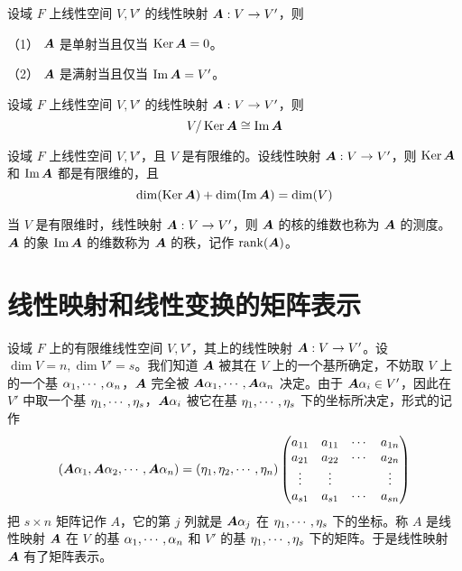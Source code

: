 \begin{proposition}
	设域 $F$ 上线性空间 $V,V'$ 的线性映射 $\boldsymbol{A} : V \to V'$，则
	
	（1） $\boldsymbol{A}$ 是单射当且仅当 $\operatorname{Ker} \boldsymbol{A} = 0$。
	
	（2） $\boldsymbol{A}$ 是满射当且仅当 $\operatorname{Im} \boldsymbol{A} = V'$。
\end{proposition}

\begin{theorem}
	设域 $F$ 上线性空间 $V,V'$ 的线性映射 $\boldsymbol{A} : V \to V'$，则
	\[ V / \operatorname{Ker} \boldsymbol{A} \cong \operatorname{Im} \boldsymbol{A} \]
\end{theorem}

\begin{theorem}
	设域 $F$ 上线性空间 $V,V'$，且 $V$ 是有限维的。设线性映射 $\boldsymbol{A} : V \to V'$，则 $\operatorname{Ker} \boldsymbol{A}$ 和 $\operatorname{Im} \boldsymbol{A}$ 都是有限维的，且
	\[ \dim(\operatorname{Ker} \boldsymbol{A}) + \dim(\operatorname{Im} \boldsymbol{A}) = \dim(V) \]
\end{theorem}

当 $V$ 是有限维时，线性映射 $\boldsymbol{A} : V \to V'$，则 $\boldsymbol{A}$ 的核的维数也称为 $\boldsymbol{A}$ 的测度。$\boldsymbol{A}$ 的象 $\operatorname{Im} \boldsymbol{A}$ 的维数称为 $\boldsymbol{A}$ 的秩，记作 $\operatorname{rank}(\boldsymbol{A})$。

\section{线性映射和线性变换的矩阵表示}

设域 $F$ 上的有限维线性空间 $V,V'$，其上的线性映射 $\boldsymbol{A} : V \to V'$。设 $\dim V = n,\dim V' = s$。我们知道 $\boldsymbol{A}$ 被其在 $V$ 上的一个基所确定，不妨取 $V$ 上的一个基 $\alpha_1,\cdots,\alpha_n$，$\boldsymbol{A}$ 完全被 $\boldsymbol{A} \alpha_1,\cdots,\boldsymbol{A} \alpha_n$ 决定。由于 $\boldsymbol{A} \alpha_i \in V'$，因此在 $V'$ 中取一个基 $\eta_1,\cdots,\eta_s$，$\boldsymbol{A} \alpha_i$ 被它在基 $\eta_1,\cdots,\eta_s$ 下的坐标所决定，形式的记作
\[ 
	\left( \boldsymbol{A} \alpha_1 , \boldsymbol{A} \alpha_2 , \cdots , \boldsymbol{A} \alpha_n \right) = 
	\left( \eta_1 , \eta_2 , \cdots , \eta_n \right)
	\left( \begin{matrix}
			a_{11} & a_{11} & \cdots & a_{1n} \\
			a_{21} & a_{22} & \cdots & a_{2n} \\
			\vdots & \vdots &		& \vdots \\
			a_{s1} & a_{s1} & \cdots & a_{sn}
		\end{matrix} \right)
\]
把 $s\times n$ 矩阵记作 $A$，它的第 $j$ 列就是 $\boldsymbol{A} \alpha_j$ 在 $\eta_1,\cdots,\eta_s$ 下的坐标。称 $A$ 是线性映射 $\boldsymbol{A}$ 在 $V$ 的基 $\alpha_1,\cdots,\alpha_n$ 和 $V'$ 的基 $\eta_1,\cdots,\eta_s$ 下的矩阵。于是线性映射 $\boldsymbol{A}$ 有了矩阵表示。

